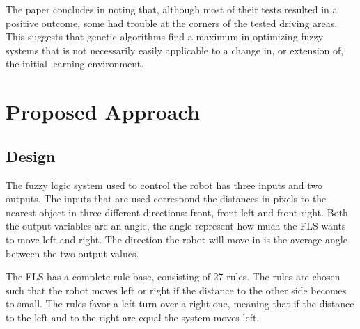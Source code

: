 \documentclass[conference]{IEEEtran}
\begin{document}
The paper concludes in noting that, although most of their tests resulted in a positive outcome, some had trouble at the corners of the tested driving areas. This suggests that genetic algorithms find a maximum in optimizing fuzzy systems that is not necessarily easily applicable to a change in, or extension of, the initial learning environment.

\section{Proposed Approach}
\subsection{Design}
The fuzzy logic system used to control the robot has three inputs and two outputs. The inputs that are used correspond the distances in pixels to the nearest object in three different directions: front, front-left and front-right. Both the output variables are an angle, the angle represent how much the FLS wants to move left and right. The direction the robot will move in is the average angle between the two output values.

The FLS has a complete rule base, consisting of 27 rules. The rules are chosen such that the robot moves left or right if the distance to the other side becomes to small. The rules favor a left turn over a right one, meaning that if the distance to the left and to the right are equal the system moves left. 
\end{document}
